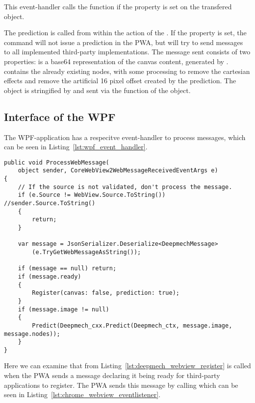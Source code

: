 This event-handler calls the  function if the  property is set on the transfered object.

The prediction is called from within the  action of the .
If the  property is set, the  command will not issue a prediction in the PWA, but will try to send messages to all implemented third-party implementations.
The message sent consists of two properties:
 is a base64 representation of the canvas content, generated by .
 contains the already existing nodes, with some processing to remove the cartesian effects and remove the artificial 16 pixel offset created by the prediction.
The object is stringified by  and sent via the  function of the  object.

\subsection{Interface of the WPF}

The WPF-application has a respecitve event-handler to process messages, which can be seen in Listing~\ref{lst:wpf_event_handler}.

\begin{lstlisting}[label={lst:wpf_event_handler}, caption={Event handler of the WPF-application}]
public void ProcessWebMessage(
    object sender, CoreWebView2WebMessageReceivedEventArgs e)
{
    // If the source is not validated, don't process the message.
    if (e.Source != WebView.Source.ToString()) //sender.Source.ToString()
    {
        return;
    }

    var message = JsonSerializer.Deserialize<DeepmechMessage>
        (e.TryGetWebMessageAsString());

    if (message == null) return;
    if (message.ready)
    {
        Register(canvas: false, prediction: true);
    }
    if (message.image != null)
    {
        Predict(Deepmech_cxx.Predict(Deepmech_ctx, message.image, message.nodes));
    }
}
\end{lstlisting}

Here we can examine that  from Listing~\ref{lst:deepmech_webview_register} is called when the PWA sends a message declaring it being ready for third-party applications to register.
The PWA sends this message by calling  which can be seen in Listing~\ref{lst:chrome_webview_eventlistener}.

